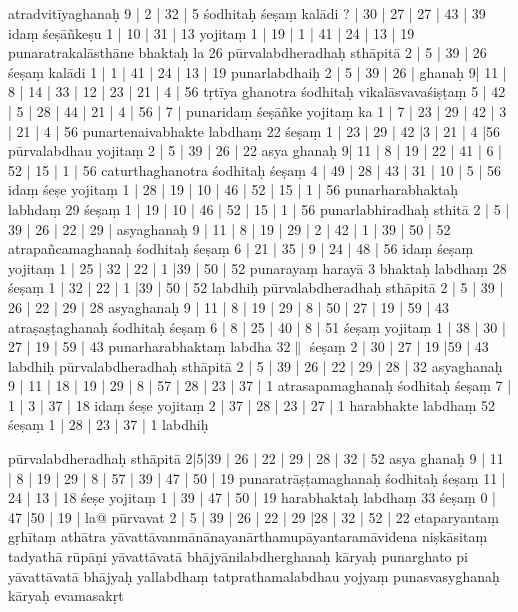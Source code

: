 \documentclass[10pt]{article}
\begin{document}
atradvitīyaghanaḥ 9 | 2 | 32 | 5 śodhitaḥ śeṣaṃ kalādi ? | 30 | 27 | 27 | 43 | 39  idaṃ śeṣāñkeṣu 1 | 
 10 | 31 | 13 yojitaṃ 1 | 19 | 1 | 41 | 24 | 13 | 19 punaratrakalāsthāne bhaktaḥ la 26 pūrvalabdheradhaḥ 
 sthāpitā 2 | 5 | 39 | 26 śeṣaṃ kalādi 1 | 1 | 41 | 24 | 13 | 19 punarlabdhaiḥ 2 | 5 | 39 | 26 | ghanaḥ 9| 11 |
  8 | 14 | 33 | 12 | 23 | 21 | 4 | 56 tṛtīya ghanotra śodhitaḥ vikalāsvavaśiṣṭaṃ 5 | 42 | 5 | 28 | 44 | 21 | 4 |
  56 | 7 | punaridaṃ śeṣāñke yojitaṃ ka 1 | 7 | 23 | 29 | 42 | 3 | 21 | 4 | 56 punartenaivabhakte labdhaṃ 
  22 śeṣaṃ 1 | 23 | 29 | 42 |3 | 21 | 4 |56 pūrvalabdhau yojitaṃ 2 | 5 | 39 | 26 | 22 asya ghanaḥ 9| 11 | 8 | 
  19 | 22 | 41 | 6 | 52 | 15 | 1 | 56 caturthaghanotra śodhitaḥ śeṣaṃ 4 | 49 | 28 | 43 | 31 | 10 | 5 | 56 idaṃ 
  śeṣe yojitaṃ 1 | 28 | 19 | 10 | 46 | 52 | 15 | 1 | 56 punarharabhaktaḥ labhdaṃ 29 śeṣaṃ 1 | 19 | 10 | 46 
  | 52 | 15 | 1 | 56 punarlabhiradhaḥ sthitā 2 | 5 | 39 | 26 | 22 | 29 | asyaghanaḥ 9 | 11 | 8 | 19 | 29 | 2 | 42 | 1 
  | 39 | 50 | 52  atrapañcamaghanaḥ śodhitaḥ śeṣaṃ 6 | 21 | 35 | 9 | 24 | 48 | 56 idaṃ śeṣaṃ yojitaṃ 
  1 | 25 | 32 | 22 | 1 |39 | 50 | 52  punarayaṃ harayā 3 bhaktaḥ labdhaṃ 28 śeṣaṃ 1 | 32 | 22 | 1 |39 | 50 | 
  52 labdhiḥ pūrvalabdheradhaḥ sthāpitā 2 | 5 | 39 | 26 | 22 | 29 | 28 asyaghanaḥ 9 | 11 | 8 | 19 | 29 | 8 | 50 
  | 27 | 19 | 59 | 43 atraṣaṣṭaghanaḥ śodhitaḥ śeṣaṃ 6 | 8 | 25 | 40 | 8 | 51 śeṣaṃ yojitaṃ 1 | 38 | 30 | 
  27 | 19  | 59 | 43 punarharabhaktaṃ labdha 32$\|$
śeṣaṃ 2 | 30 | 27 | 19 |59 | 43 labdhiḥ pūrvalabdheradhaḥ 
  sthāpitā 2 | 5 | 39 | 26 | 22 | 29 | 28 | 32 asyaghanaḥ 9 | 11 | 18 | 19 | 29 | 8 | 57 | 28 | 23 | 37 | 1 atrasapamaghanaḥ śodhitaḥ śeṣaṃ 7 | 1 | 3 | 37 | 18  idaṃ śeṣe yojitaṃ 2 | 37 | 28 | 23 |  27 | 1  harabhakte labdhaṃ 52 śeṣaṃ 1 | 28 | 23 | 37 | 1 labdhiḥ 
 
pūrvalabdheradhaḥ sthāpitā 2|5|39 | 26 | 22 | 29 | 28 | 32 | 52 asya ghanaḥ 9 | 11 | 8 | 19 | 29 | 8 | 57 | 39 | 47 | 50 | 19 punaratrāṣṭamaghanaḥ śodhitaḥ śeṣaṃ 11 | 24 | 13 | 18 
  śeṣe yojitaṃ 1 | 39 | 47 | 50 | 19 harabhaktaḥ labdhaṃ 33 śeṣaṃ 0 | 47 |50 | 19 | 
la@  
pūrvavat 2 | 5 | 39 | 26 | 22 | 29 |28 | 32 | 52 | 22 etaparyantaṃ gṛhītaṃ athātra yāvattāvanmānānayanārthamupāyantaramāvidena niṣkāsitaṃ tadyathā rūpāṇi yāvattāvatā bhājyānilabdherghanaḥ kāryaḥ punarghato pi yāvattāvatā bhājyaḥ yallabdhaṃ tatprathamalabdhau yojyaṃ punasvasyghanaḥ kāryaḥ evamasakṛt 
\end{document}
